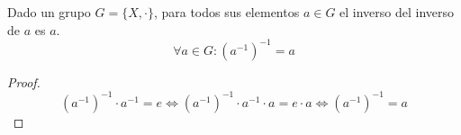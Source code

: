\begin{thm}
    Dado un grupo $G = \{X, \cdot\}$, para todos sus elementos $a\in G$ el inverso del inverso de $a$ es $a$.
    \begin{equation}
        \forall a \in G : (a^{-1})^{-1} = a 
    \end{equation}
\end{thm}

\begin{proof}
    \begin{equation}
        (a^{-1})^{-1} \cdot a^{-1} = e \iff  (a^{-1})^{-1} \cdot a^{-1} \cdot a = e \cdot a \iff (a^{-1})^{-1} = a
    \end{equation} 
\end{proof}
